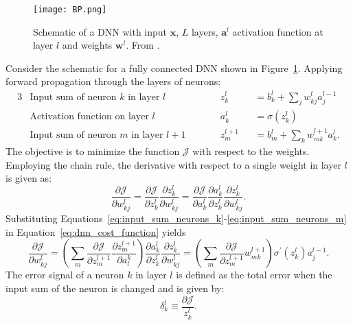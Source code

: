 \begin{figure}[ht!]
	\centering
	\texttt{[image: BP.png]}
	\caption[DNN schematic]{Schematic of a DNN with input $\boldsymbol{x}$, $L$ layers, $\boldsymbol{a}^l$ activation function at layer $l$ and weights $\boldsymbol{w}^l$. From \cite{Hallstrom2016}.}
	\label{fig:DNN_schematic}
\end{figure}
Consider the schematic for a fully connected DNN shown in Figure~\ref{fig:DNN_schematic}. Applying forward propagation through the layers of neurons:
\begin{alignat}{3}
&\text{Input sum of neuron $k$ in layer $l$} \qquad && z_k^l &&=b_k^l+\sum_{j}w_{kj}^l a_j^{l-1} \label{eq:input_sum_neurons_k}\\
&\text{Activation function on layer $l$}\qquad &&a_k^l &&=\sigma\left(z_k^l\right)\\
&\text{Input sum of neuron $m$ in layer $l+1$}\qquad &&z_m^{l+1}&&=b_m^l+\sum_{k}w_{mk}^{l+1} a_k^l \label{eq:input_sum_neurons_m}.
\end{alignat}
The objective is to minimize the function $\mathcal{J}$ with respect to the weights. Employing the chain rule, the derivative with respect to a single weight in layer $l$ is given as:
\begin{equation}
	\frac{\partial \mathcal{J}}{\partial w_{kj}^l} = 
	\frac{\partial \mathcal{J}}{\partial z_k^l}\frac{\partial z_k^l}{\partial w_{kj}^l} =
	\frac{\partial \mathcal{J}}{\partial a_k^l}\frac{\partial a_k^l}{\partial z_{k}^l}\frac{\partial z_k^l}{\partial w_{kj}^l}.
	\label{eq:dnn_cost_function}
\end{equation}
Substituting Equations~\ref{eq:input_sum_neurons_k}-\ref{eq:input_sum_neurons_m} in Equation~\ref{eq:dnn_cost_function} yields
\begin{equation}
	\frac{\partial \mathcal{J}}{\partial w_{kj}^l} = 
	\left( \sum_{m} 	\frac{\partial \mathcal{J}}{\partial z_m^{l+1}}\frac{\partial z_m^{l+1}}{\partial a_l^k}  \right)
	\frac{\partial a_k^l}{\partial z_{k}^l}\frac{\partial z_k^l}{\partial w_{kj}^l} =
	\left( \sum_{m}\frac{\partial \mathcal{J}}{\partial z_m^{l+1}} w_{mk}^{l+1} \right) \sigma^{'}\left( z_k^l\right) a_j^{l-1}.
	\label{eq:dnn_cost_function_substitute}
\end{equation}
The error signal of a neuron $k$ in layer $l$ is defined as the total error when the input sum of the neuron is changed and is given by:
\begin{equation}
	\delta_k^l\equiv\frac{\partial\mathcal{J}}{z_k^l}.
\end{equation}
